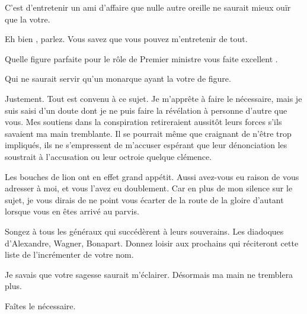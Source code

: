 \begin{drama}
  \generalspeaks C’est d’entretenir un ami d’affaire que nulle autre oreille ne saurait mieux ouïr que la votre.


  \exit{\alexas}

  \elenaspeaks Eh bien \general, parlez. Vous savez que vous pouvez m’entretenir de tout.

  \generalspeaks Quelle figure parfaite pour le rôle de Premier ministre vous faite excellent \elena.

  \elenaspeaks Qui ne saurait servir qu’un monarque ayant la votre de figure.

  \generalspeaks Justement. Tout est convenu à ce sujet. Je m’apprête à faire le nécessaire, mais je suis saisi d’un doute dont je ne puis faire la révélation à personne d’autre que vous. Mes soutiens dans la conspiration retireraient aussitôt leurs forces s’ils savaient ma main tremblante. Il se pourrait même que craignant de n’être trop impliqués, ils ne s’empressent de m’accuser espérant que leur dénonciation les soustrait à l’accusation ou leur octroie quelque clémence.

  \elenaspeaks Les bouches de lion ont en effet grand appétit. Aussi avez-vous eu raison de vous adresser à moi, et vous l’avez eu doublement. Car en plus de mon silence sur le sujet, je vous dirais de ne point vous écarter de la route de la gloire d’autant lorsque vous en êtes arrivé au parvis.

  Songez à tous les généraux qui succédèrent à leurs souverains. Les diadoques d’Alexandre, Wagner, Bonapart. Donnez loisir aux prochains qui réciteront cette liste de l’incrémenter de votre nom.

  \generalspeaks Je savais que votre sagesse saurait m’éclairer. Désormais ma main ne tremblera plus.

  \elenaspeaks Faîtes le nécessaire.
\end{drama}

\scene

\StageDirII{\roi, \ela, \kingsgards, \general, \conspirateurs}



